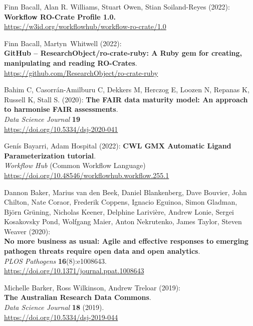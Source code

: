\begin{thebibliography}{9}
Finn Bacall, Alan R. Williams, Stuart Owen, Stian
Soiland-Reyes (2022):\\
\textbf{Workflow RO-Crate Profile 1.0.}\\
\url{https://w3id.org/workflowhub/workflow-ro-crate/1.0}

Finn Bacall, Martyn~Whitwell (2022):\\
\textbf{GitHub -- ResearchObject/ro-crate-ruby: A Ruby gem for creating,
manipulating and reading RO-Crates}.\\
\url{https://github.com/ResearchObject/ro-crate-ruby}

Bahim C, Casorrán-Amilburu C, Dekkers M, Herczog E, Loozen N, Repanas K, Russell K, Stall S. (2020):
\textbf{The FAIR data maturity model: An approach to harmonise FAIR assessments}.\\
\emph{Data Science Journal} \textbf{19}\\
\url{https://doi.org/10.5334/dsj-2020-041}

Genís Bayarri, Adam Hospital (2022): \textbf{CWL GMX
Automatic Ligand Parameterization tutorial}.\\
\emph{Workflow Hub} (Common Workflow Language)\\
\url{https://doi.org/10.48546/workflowhub.workflow.255.1}

Dannon Baker, Marius van den Beek, Daniel Blankenberg, Dave
Bouvier, John Chilton, Nate Coraor, Frederik Coppens, Ignacio Eguinoa,
Simon Gladman, Björn Grüning, Nicholas Keener, Delphine Larivière,
Andrew Lonie, Sergei Kosakovsky Pond, Wolfgang Maier, Anton Nekrutenko,
James Taylor, Steven Weaver (2020):\\
\textbf{No more business as usual: Agile and effective responses to
emerging pathogen threats require open data and open analytics}.\\
\emph{PLOS Pathogens} \textbf{16}(8):e1008643.\\
\url{https://doi.org/10.1371/journal.ppat.1008643}

Michelle Barker, Ross Wilkinson, Andrew Treloar (2019):\\
\textbf{The Australian Research Data Commons}.\\
\emph{Data Science Journal} \textbf{18} (2019).\\
\url{https://doi.org/10.5334/dsj-2019-044}


\end{thebibliography}
